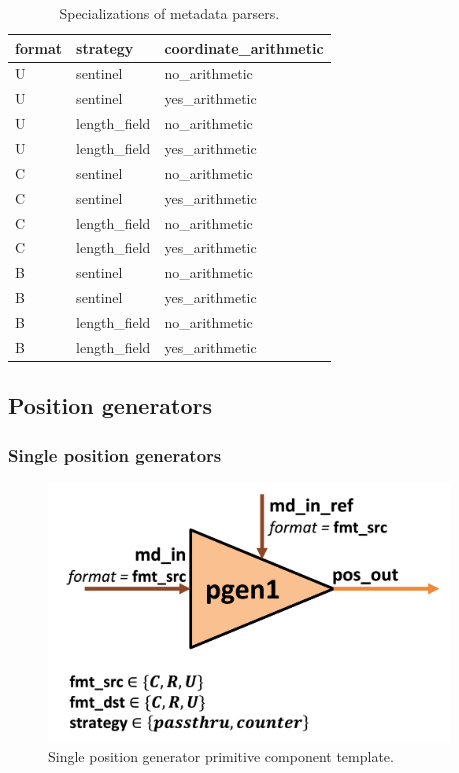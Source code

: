 \begin{table}[H]
\centering
\begin{tabular}{lll}
\toprule
 format   & strategy       & coordinate\_arithmetic   \\
\midrule
 U        & sentinel & no\_arithmetic                \\
 U        & sentinel & yes\_arithmetic                 \\
 U        & length\_field & no\_arithmetic              \\
 U        & length\_field & yes\_arithmetic             \\
 C        & sentinel & no\_arithmetic                \\
 C        & sentinel & yes\_arithmetic                 \\
 C        & length\_field & no\_arithmetic              \\
 C        & length\_field & yes\_arithmetic             \\
 B        & sentinel & no\_arithmetic                  \\
 B        & sentinel & yes\_arithmetic                 \\
 B        & length\_field & no\_arithmetic              \\
 B        & length\_field & yes\_arithmetic             \\
\bottomrule
\end{tabular}
\caption{Specializations of metadata parsers.}
\label{tab:MetadataParser_specializations}
\end{table}

\subsection{Position generators}

\subsubsection{Single position generators}

\begin{figure}[H]
    \centering
    \includegraphics[width=0.95\textwidth]{figures/pgen1.png}
    \caption{Single position generator primitive component template.}
    \label{fig:pgen1}
\end{figure}

